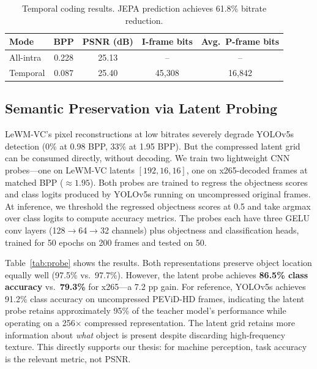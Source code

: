 \documentclass{article}
\begin{document}
\begin{table}[ht]
\centering
\caption{Temporal coding results. JEPA prediction achieves 61.8\% bitrate reduction.}
\label{tab:temporal}
\begin{tabular}{lcccc}
\toprule
Mode      & BPP   & PSNR (dB) & I-frame bits & Avg.\ P-frame bits \\
\midrule
All-intra & 0.228 & 25.13     & --           & --                 \\
Temporal  & 0.087 & 25.40     & 45,308       & 16,842             \\
\bottomrule
\end{tabular}
\end{table}

\subsection{Semantic Preservation via Latent Probing}
\label{sec:semantic}

LeWM-VC's pixel reconstructions at low bitrates severely degrade YOLOv5s detection (0\% at 0.98 BPP, 33\% at 1.95 BPP). But the compressed latent grid can be consumed directly, without decoding. We train two lightweight CNN probes---one on LeWM-VC latents $[192, 16, 16]$, one on x265-decoded frames at matched BPP (${\approx}1.95$). Both probes are trained to regress the objectness scores and class logits produced by YOLOv5s running on uncompressed original frames. At inference, we threshold the regressed objectness scores at 0.5 and take argmax over class logits to compute accuracy metrics. The probes each have three GELU conv layers (128$\rightarrow$64$\rightarrow$32 channels) plus objectness and classification heads, trained for 50 epochs on 200 frames and tested on 50.

Table~\ref{tab:probe} shows the results. Both representations preserve object location equally well (97.5\% vs.\ 97.7\%). However, the latent probe achieves \textbf{86.5\% class accuracy} vs.\ \textbf{79.3\%} for x265---a 7.2 pp gain. For reference, YOLOv5s achieves 91.2\% class accuracy on uncompressed PEViD-HD frames, indicating the latent probe retains approximately 95\% of the teacher model's performance while operating on a 256$\times$ compressed representation. The latent grid retains more information about \textit{what} object is present despite discarding high-frequency texture. This directly supports our thesis: for machine perception, task accuracy is the relevant metric, not PSNR.
\end{document}
